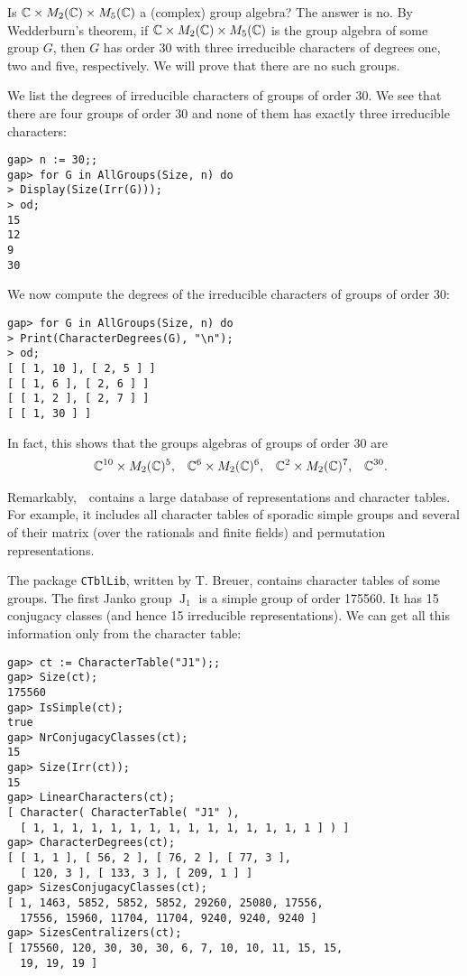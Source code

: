 \begin{example}
	Is $\mathbb{C}\times M_2(\mathbb{C})\times M_{5}(\mathbb{C})$ a (complex) group algebra? The answer is no.  
    By Wedderburn's theorem, if $\mathbb{C}\times M_2(\mathbb{C})\times M_{5}(\mathbb{C})$ is the group algebra of some group $G$, then
	$G$ has order 30 with three 
	irreducible characters of 
	degrees one, two and five, respectively. We will
	prove that there are no such groups.  
	
We list the degrees
of irreducible characters of groups of order $30$. We see that there are four
groups of order $30$ and none of them has exactly three 
irreducible characters: 
\begin{lstlisting}
gap> n := 30;;
gap> for G in AllGroups(Size, n) do
> Display(Size(Irr(G)));
> od;
15
12
9
30
\end{lstlisting}
We now compute the degrees of the irreducible characters
of groups of order 30:
\begin{lstlisting}
gap> for G in AllGroups(Size, n) do
> Print(CharacterDegrees(G), "\n");
> od;
[ [ 1, 10 ], [ 2, 5 ] ]
[ [ 1, 6 ], [ 2, 6 ] ]
[ [ 1, 2 ], [ 2, 7 ] ]
[ [ 1, 30 ] ]
\end{lstlisting}
In fact, this shows that the groups algebras of groups of order $30$
are 
\begin{align*}
  &&\mathbb{C}^{10}\times M_2(\mathbb{C})^5,
  &&\mathbb{C}^{6}\times M_2(\mathbb{C})^6,
  &&\mathbb{C}^{2}\times M_2(\mathbb{C})^7,
  &&\mathbb{C}^{30}.
\end{align*}
\end{example}

Remarkably,~\GAP~contains a large database 
of representations and character tables. For example, it includes 
all character tables of sporadic simple groups and several 
of their matrix (over the rationals and finite fields) and permutation
representations. 

\begin{example}
    \label{exa:degreesJ1}
    The package \lstinline{CTblLib}, written by T. Breuer, 
    contains character tables of some groups. The first
    Janko group $\operatorname{J}_1$ is a simple group of 
    order 175560. It has 
    15 conjugacy classes (and hence 15
    irreducible representations). 
    We can get all this information only from the character table:
\begin{lstlisting}
gap> ct := CharacterTable("J1");;
gap> Size(ct);
175560
gap> IsSimple(ct);
true
gap> NrConjugacyClasses(ct);
15
gap> Size(Irr(ct));
15
gap> LinearCharacters(ct);
[ Character( CharacterTable( "J1" ),
  [ 1, 1, 1, 1, 1, 1, 1, 1, 1, 1, 1, 1, 1, 1, 1 ] ) ]
gap> CharacterDegrees(ct);
[ [ 1, 1 ], [ 56, 2 ], [ 76, 2 ], [ 77, 3 ],
  [ 120, 3 ], [ 133, 3 ], [ 209, 1 ] ]
gap> SizesConjugacyClasses(ct);
[ 1, 1463, 5852, 5852, 5852, 29260, 25080, 17556,
  17556, 15960, 11704, 11704, 9240, 9240, 9240 ]
gap> SizesCentralizers(ct);
[ 175560, 120, 30, 30, 30, 6, 7, 10, 10, 11, 15, 15,
  19, 19, 19 ]
\end{lstlisting}
\end{example}


